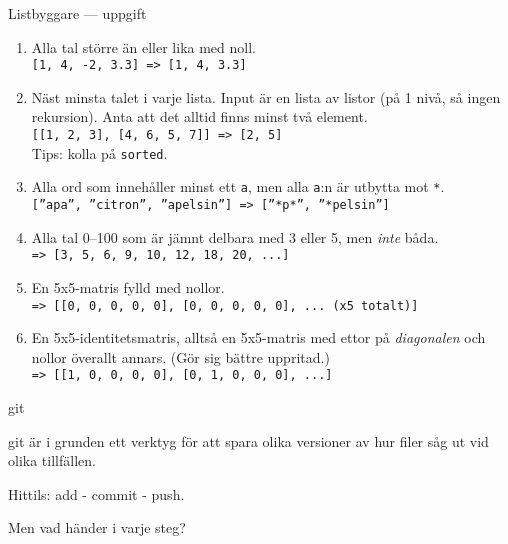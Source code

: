 \documentclass{beamer}
\begin{document}
  \begin{frame}{Listbyggare --- uppgift}

    \footnotesize

    \pause{}

    \begin{enumerate}[<+->]
      \item Alla tal större än eller lika med noll. \\
            \texttt{[1, 4, -2, 3.3] => [1, 4, 3.3]}

      \item Näst minsta talet i varje lista. Input är en lista av listor (på 1
            nivå, så ingen rekursion). Anta att det alltid finns minst två element. \\
            \texttt{[[1, 2, 3], [4, 6, 5, 7]] => [2, 5]} \\
            Tips: kolla på \texttt{sorted}.

      \item Alla ord som innehåller minst ett \texttt{a}, men alla \texttt{a}:n
            är utbytta mot \texttt{*}. \\
            \texttt{[''apa'', ''citron'', ''apelsin''] => [''*p*'', ''*pelsin'']}

      \item Alla tal 0--100 som är jämnt delbara med 3 eller 5, men
            \emph{inte} båda. \\
            \texttt{=> [3, 5, 6, 9, 10, 12, 18, 20, ...]}

      \item En 5x5-matris fylld med nollor. \\
            \texttt{=> [[0, 0, 0, 0, 0], [0, 0, 0, 0, 0], ... (x5 totalt)]}

      \item En 5x5-identitetsmatris, alltså en 5x5-matris med ettor på
            \emph{diagonalen} och nollor överallt annars. (Gör sig bättre uppritad.) \\
            \texttt{=> [[1, 0, 0, 0, 0], [0, 1, 0, 0, 0], ...]}


    \end{enumerate}

  \end{frame}

  \begin{frame}{git}

    git är i grunden ett verktyg för att spara olika versioner av hur filer såg
    ut vid olika tillfällen.

    Hittils: add - commit - push.

    Men vad händer i varje steg?

  \end{frame}
\end{document}
